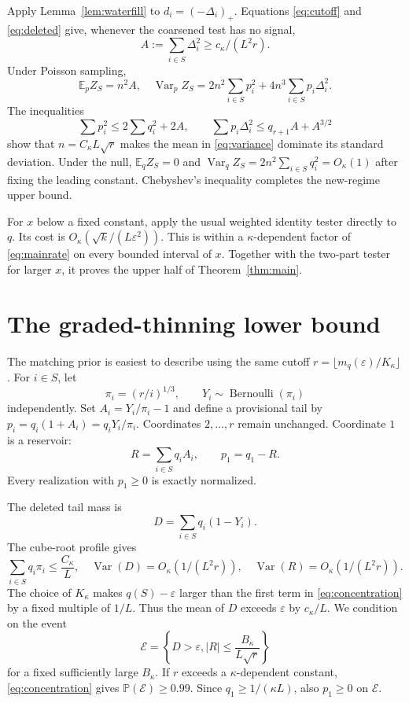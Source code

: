 \documentclass{article}
\newcommand{\E}{\mathbb E}
\newcommand{\Pp}{\mathbb P}
\newcommand{\Var}{\operatorname{Var}}
\newcommand{\1}{\mathbf 1}
\begin{document}
Apply Lemma~\ref{lem:waterfill} to $d_i=(-\Delta_i)_+$. Equations \eqref{eq:cutoff} and \eqref{eq:deleted} give, whenever the coarsened test has no signal, \[ A:=\sum_{i\in S}\Delta_i^2\geq c_\kappa/(L^2r). \tag{10}\label{eq:l2signal} \] Under Poisson sampling, \[ \E_p Z_S=n^2A, \quad \Var_p Z_S =2n^2\sum_{i\in S}p_i^2 +4n^3\sum_{i\in S}p_i\Delta_i^2. \tag{11}\label{eq:variance} \] The inequalities \[ \sum p_i^2\leq2\sum q_i^2+2A, \qquad \sum p_i\Delta_i^2 \leq q_{r+1}A+A^{3/2} \tag{12}\label{eq:variancebounds} \] show that $n=C_\kappa L\sqrt r$ makes the mean in \eqref{eq:variance} dominate its standard deviation. Under the null, $\E_qZ_S=0$ and $\Var_qZ_S=2n^2\sum_{i\in S}q_i^2=O_\kappa(1)$ after fixing the leading constant. Chebyshev's inequality completes the new-regime upper bound.

For $x$ below a fixed constant, apply the usual weighted identity tester directly to $q$. Its cost is $O_\kappa(\sqrt{k}/(L\varepsilon^2))$. This is within a $\kappa$-dependent factor of \eqref{eq:mainrate} on every bounded interval of $x$. Together with the two-part tester for larger $x$, it proves the upper half of Theorem~\ref{thm:main}.

\section{The graded-thinning lower bound}
\label{sec:lower}

The matching prior is easiest to describe using the same cutoff $r=\lfloor m_q(\varepsilon)/K_\kappa\rfloor$. For $i\in S$, let \[ \pi_i=(r/i)^{1/3}, \qquad Y_i\sim\operatorname{Bernoulli}(\pi_i) \tag{13}\label{eq:retention} \] independently. Set $A_i=Y_i/\pi_i-1$ and define a provisional tail by $p_i=q_i(1+A_i)=q_iY_i/\pi_i$. Coordinates $2,\ldots,r$ remain unchanged. Coordinate $1$ is a reservoir: \[ R=\sum_{i\in S}q_iA_i, \qquad p_1=q_1-R. \tag{14}\label{eq:reservoir} \] Every realization with $p_1\geq0$ is exactly normalized.

The deleted tail mass is \[ D=\sum_{i\in S}q_i(1-Y_i). \] The cube-root profile gives \[ \sum_{i\in S}q_i\pi_i\leq\frac{C_\kappa}{L}, \quad \Var(D)=O_\kappa(1/(L^2r)), \quad \Var(R)=O_\kappa(1/(L^2r)). \tag{15}\label{eq:concentration} \] The choice of $K_\kappa$ makes $q(S)-\varepsilon$ larger than the first term in \eqref{eq:concentration} by a fixed multiple of $1/L$. Thus the mean of $D$ exceeds $\varepsilon$ by $c_\kappa/L$. We condition on the event \[ \mathcal E=\left\{D>\varepsilon, |R|\leq\frac{B_\kappa}{L\sqrt r}\right\} \tag{16}\label{eq:event} \] for a fixed sufficiently large $B_\kappa$. If $r$ exceeds a $\kappa$-dependent constant, \eqref{eq:concentration} gives $\Pp(\mathcal E)\geq0.99$. Since $q_1\geq1/(\kappa L)$, also $p_1\geq0$ on $\mathcal E$.
\end{document}

